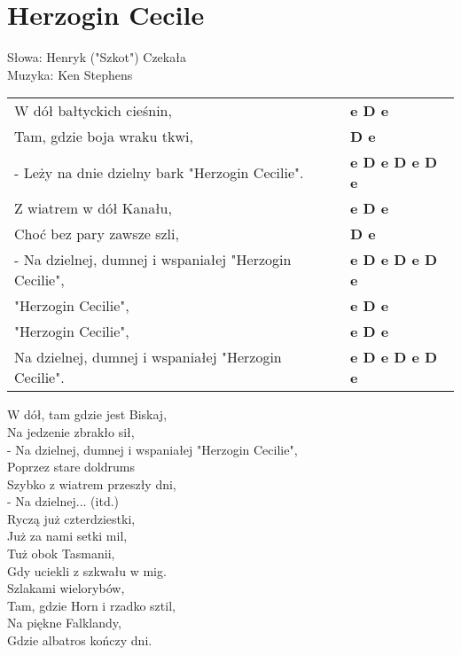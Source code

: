 \section{Herzogin Cecile}

Słowa: Henryk ("Szkot") Czekała\\
Muzyka: Ken Stephens

\vspace{2em}
\begin{tabular}{@{}p{9cm}@{}l@{}}
W dół bałtyckich cieśnin, & \bfseries  e D e \\
Tam, gdzie boja wraku tkwi, & \bfseries  D e \\
- Leży na dnie dzielny bark "Herzogin Cecilie". & \bfseries  e D e D e D e \\
Z wiatrem w dół Kanału, & \bfseries  e D e \\
Choć bez pary zawsze szli, & \bfseries  D e \\
- Na dzielnej, dumnej i wspaniałej "Herzogin Cecilie", & \bfseries  e D e D e D e \\
"Herzogin Cecilie", & \bfseries  e D e \\
"Herzogin Cecilie",  & \bfseries  e D e \\
Na dzielnej, dumnej i wspaniałej "Herzogin Cecilie". & \bfseries  e D e D e D e \\
\end{tabular}

\vspace{1em}
W dół, tam gdzie jest Biskaj, \\
Na jedzenie zbrakło sił, \\
- Na dzielnej, dumnej i wspaniałej "Herzogin Cecilie", \\
Poprzez stare doldrums \\
Szybko z wiatrem przeszły dni, \\
- Na dzielnej... (itd.) \\

Ryczą już czterdziestki, \\
Już za nami setki mil, \\
Tuż obok Tasmanii, \\
Gdy uciekli z szkwału w mig. \\

Szlakami wielorybów, \\
Tam, gdzie Horn i rzadko sztil, \\
Na piękne Falklandy, \\
Gdzie albatros kończy dni. \\

